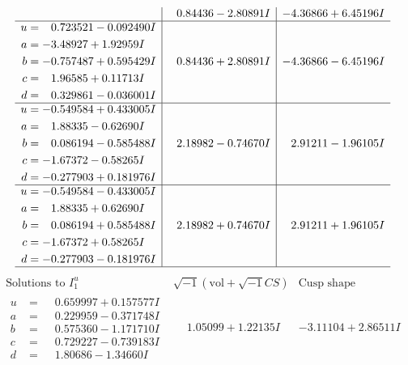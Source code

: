 \documentclass[1p]{elsarticle_modified}
\theoremstyle{definition}
\newcommand{\I}{\sqrt{-1}}
\begin{document}
$$\begin{array}{c|c|c}
 & \phantom{-}0.84436 - 2.80891 I & -4.36866 + 6.45196 I \\ \hline\begin{aligned}
u &= \phantom{-}0.723521 - 0.092490 I \\
a &= -3.48927 + 1.92959 I \\
b &= -0.757487 + 0.595429 I \\
c &= \phantom{-}1.96585 + 0.11713 I \\
d &= \phantom{-}0.329861 - 0.036001 I\end{aligned}
 & \phantom{-}0.84436 + 2.80891 I & -4.36866 - 6.45196 I \\ \hline\begin{aligned}
u &= -0.549584 + 0.433005 I \\
a &= \phantom{-}1.88335 - 0.62690 I \\
b &= \phantom{-}0.086194 - 0.585488 I \\
c &= -1.67372 - 0.58265 I \\
d &= -0.277903 + 0.181976 I\end{aligned}
 & \phantom{-}2.18982 - 0.74670 I & \phantom{-}2.91211 - 1.96105 I \\ \hline\begin{aligned}
u &= -0.549584 - 0.433005 I \\
a &= \phantom{-}1.88335 + 0.62690 I \\
b &= \phantom{-}0.086194 + 0.585488 I \\
c &= -1.67372 + 0.58265 I \\
d &= -0.277903 - 0.181976 I\end{aligned}
 & \phantom{-}2.18982 + 0.74670 I & \phantom{-}2.91211 + 1.96105 I\\
 \hline 
 \end{array}$$\newpage$$\begin{array}{c|c|c}  
\text{Solutions to }I^u_{1}& \I (\text{vol} + \sqrt{-1}CS) & \text{Cusp shape}\\
 \hline 
\begin{aligned}
u &= \phantom{-}0.659997 + 0.157577 I \\
a &= \phantom{-}0.229959 - 0.371748 I \\
b &= \phantom{-}0.575360 - 1.171710 I \\
c &= \phantom{-}0.729227 - 0.739183 I \\
d &= \phantom{-}1.80686 - 1.34660 I\end{aligned}
 & \phantom{-}1.05099 + 1.22135 I & -3.11104 + 2.86511 I \\ \hline\begin{aligned}

\end{aligned}
\end{array}$$
\end{document}
